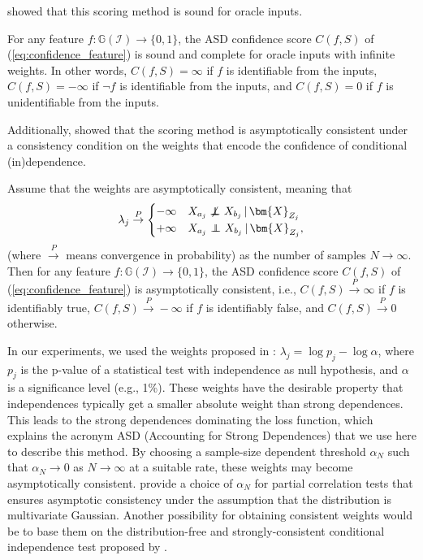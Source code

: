 \documentclass[twoside,11pt]{article}
\DeclareMathOperator*{\CI}{{\,\perp\mkern-12mu\perp\,}}
\DeclareMathOperator*{\nCI}{{\,\not\mkern-1mu\perp\mkern-12mu\perp\,}}
\newcommand\B[1]{\bm{#1}}
\newcommand\C[1]{\mathcal{#1}}
\newcommand\given{\,|\,}
\newcommand{\xto}[1]{\stackrel{#1}{\to}}
\begin{document}
\cite{MagliacaneClaassenMooij_NIPS_16} showed that this scoring method is sound for oracle inputs.
\begin{theorem}\label{theo:ASD_sound_complete}
For any feature $f : \mathbb{G}(\C{I}) \to \{0,1\}$, the ASD confidence score $C(f,S)$ of (\ref{eq:confidence_feature}) is sound and complete for oracle inputs with infinite weights. In other words,
$C(f,S)=\infty$ if $f$ is identifiable from the inputs,
$C(f,S)=-\infty$ if $\lnot f$ is identifiable from the inputs, and $C(f,S)=0$ if $f$ is unidentifiable from the inputs.
\end{theorem}
Additionally, \cite{MagliacaneClaassenMooij_NIPS_16} showed that the scoring method is asymptotically consistent under a consistency condition on the weights that encode the confidence of conditional (in)dependence.
\begin{theorem}\label{theo:ASD_consistent}
Assume that the weights are asymptotically consistent, meaning that
\begin{equation}\label{eq:weightFreqConsistency}
\lambda_j \xto{P} \begin{cases}
  -\infty & X_{a_j} \nCI X_{b_j} \given \B{X}_{Z_j} \\
  +\infty & X_{a_j} \CI X_{b_j} \given \B{X}_{Z_j},
\end{cases}
\end{equation}
(where $\xto{P}$ means convergence in probability) as the number of samples $N \to \infty$.
Then for any feature $f : \mathbb{G}(\C{I}) \to \{0,1\}$, the ASD confidence score $C(f,S)$ of (\ref{eq:confidence_feature}) is asymptotically consistent, i.e., $C(f,S) \xto{P} \infty$ if $f$ is identifiably true, $C(f,S) \xto{P} -\infty$ if $f$ is identifiably false, and $C(f,S) \xto{P} 0$ otherwise.
\end{theorem}

In our experiments, we used the weights proposed in \cite{MagliacaneClaassenMooij_NIPS_16}:
$\lambda_j = \log p_j - \log \alpha$, where $p_j$ is the p-value of a statistical test with independence
as null hypothesis, and $\alpha$ is a significance level (e.g., 1\%).
These weights have the desirable property that independences typically get a smaller absolute weight 
than strong dependences. This leads to the strong dependences dominating the loss function, which explains
the acronym ASD (Accounting for Strong Dependences) that we use here to describe this method.
By choosing a sample-size dependent threshold $\alpha_N$ such that $\alpha_N \to 0$ as $N \to \infty$ at a suitable rate, 
these weights may become asymptotically consistent. \cite{KalischBuehlmann2007} provide a choice of $\alpha_N$ for 
partial correlation tests that ensures
asymptotic consistency under the assumption that the distribution is multivariate Gaussian.
Another possibility for obtaining consistent weights would be to base them on the 
distribution-free and strongly-consistent conditional independence test proposed by \cite{GyorfiWalk2012}.
\end{document}
